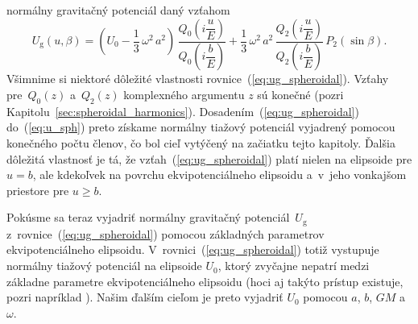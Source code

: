 \documentclass[a4paper, 12pt]{book}
\newcommand{\gidx}{\mathrm g}
\begin{document}
normálny gravitačný potenciál daný vzťahom
%
\begin{equation}
\label{eq:ug_spheroidal}
U_\gidx(u, \beta) = \left( U_0 - \frac{1}{3} \, \omega^2 \, a^2 \right) \, 
\frac{Q_0\left( i \dfrac{u}{E} \right)}{Q_0\left( i \dfrac{b}{E} \right)} 
+ \frac{1}{3} \, \omega^2 \, a^2  \, \frac{Q_2\left( i \dfrac{u}{E} 
\right)}{Q_2\left( i \dfrac{b}{E} \right)} \, P_2(\sin\beta){.}
\end{equation}
%
Všimnime si niektoré dôležité vlastnosti rovnice~(\ref{eq:ug_spheroidal}).  
Vzťahy pre~$Q_0(z)$ a~$Q_2(z)$ komplexného argumentu $z$ sú konečné (pozri 
Kapitolu~\ref{sec:spheroidal_harmonics}).  Dosadením~(\ref{eq:ug_spheroidal}) 
do~(\ref{eq:u_sph}) preto získame normálny tiažový potenciál vyjadrený pomocou 
konečného počtu členov, čo bol cieľ vytýčený na začiatku tejto kapitoly.  
Ďalšia dôležitá vlastnosť je tá, že vzťah~(\ref{eq:ug_spheroidal}) platí nielen 
na elipsoide pre $u = b$, ale kdekoľvek na povrchu ekvipotenciálneho elipsoidu 
a~v~jeho vonkajšom priestore pre $u \geq b$.

Pokúsme sa teraz vyjadriť normálny gravitačný potenciál~$U_\gidx$ 
z~rovnice~(\ref{eq:ug_spheroidal}) pomocou základných parametrov 
ekvipotenciálneho elipsoidu.  V~rovnici~(\ref{eq:ug_spheroidal}) totiž 
vystupuje normálny tiažový potenciál na elipsoide $U_0$, ktorý zvyčajne nepatrí 
medzi základne parametre ekvipotenciálneho elipsoidu (hoci aj takýto prístup 
existuje, pozri napríklad \cite{TorgeGeodesy}).  Našim ďalším cieľom je preto  
vyjadriť $U_0$ pomocou $a$, $b$, $GM$ a~$\omega$.
\end{document}
